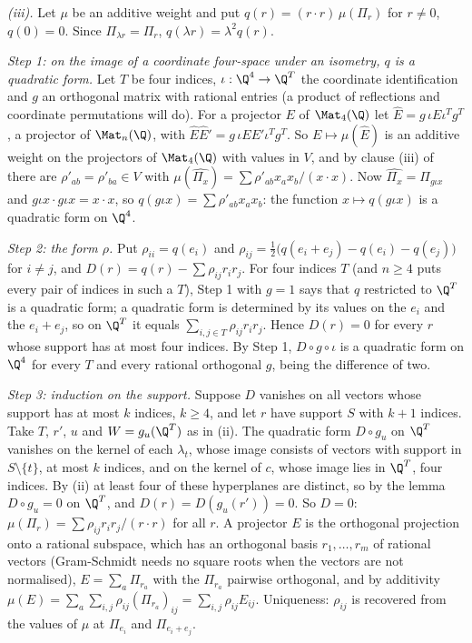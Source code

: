 \emph{(iii).} Let $\mu$ be an additive weight and put $q(r) = (r \cdot r)\,\mu(\Pi_{r})$ for $r \ne 0$, $q(0) = 0$. Since $\Pi_{\lambda r} = \Pi_{r}$, $q(\lambda r) = \lambda^{2}q(r)$.

\emph{Step 1: on the image of a coordinate four-space under an isometry, $q$ is a quadratic form.} Let $T$ be four indices, $\iota : \Q^{4} \to \Q^{T}$ the coordinate identification and $g$ an orthogonal matrix with rational entries (a product of reflections and coordinate permutations will do). For a projector $E$ of $\Mat_{4}(\Q)$ let $\hat{E} = g\,\iota E\iota^{T}g^{T}$, a projector of $\Mat_{n}(\Q)$, with $\hat{E}\hat{E}' = g\,\iota EE'\iota^{T}g^{T}$. So $E \mapsto \mu(\hat{E})$ is an additive weight on the projectors of $\Mat_{4}(\Q)$ with values in $V$, and by clause (iii) of  there are $\rho'_{ab} = \rho'_{ba} \in V$ with $\mu(\widehat{\Pi_{x}}) = \sum\rho'_{ab}x_{a}x_{b}/(x \cdot x)$. Now $\widehat{\Pi_{x}} = \Pi_{g\iota x}$ and $g\iota x \cdot g\iota x = x \cdot x$, so $q(g\iota x) = \sum\rho'_{ab}x_{a}x_{b}$: the function $x \mapsto q(g\iota x)$ is a quadratic form on $\Q^{4}$.

\emph{Step 2: the form $\rho$.} Put $\rho_{ii} = q(e_{i})$ and $\rho_{ij} = \tfrac12\bigl(q(e_{i} + e_{j}) - q(e_{i}) - q(e_{j})\bigr)$ for $i \ne j$, and $D(r) = q(r) - \sum\rho_{ij}r_{i}r_{j}$. For four indices $T$ (and $n \ge 4$ puts every pair of indices in such a $T$), Step 1 with $g = 1$ says that $q$ restricted to $\Q^{T}$ is a quadratic form; a quadratic form is determined by its values on the $e_{i}$ and the $e_{i} + e_{j}$, so on $\Q^{T}$ it equals $\sum_{i,j \in T}\rho_{ij}r_{i}r_{j}$. Hence $D(r) = 0$ for every $r$ whose support has at most four indices. By Step 1, $D \circ g \circ \iota$ is a quadratic form on $\Q^{4}$ for every $T$ and every rational orthogonal $g$, being the difference of two.

\emph{Step 3: induction on the support.} Suppose $D$ vanishes on all vectors whose support has at most $k$ indices, $k \ge 4$, and let $r$ have support $S$ with $k + 1$ indices. Take $T$, $r'$, $u$ and $W = g_{u}(\Q^{T})$ as in (ii). The quadratic form $D \circ g_{u}$ on $\Q^{T}$ vanishes on the kernel of each $\lambda_{t}$, whose image consists of vectors with support in $S \setminus \{t\}$, at most $k$ indices, and on the kernel of $c$, whose image lies in $\Q^{T}$, four indices. By (ii) at least four of these hyperplanes are distinct, so by the lemma $D \circ g_{u} = 0$ on $\Q^{T}$, and $D(r) = D(g_{u}(r')) = 0$. So $D = 0$: $\mu(\Pi_{r}) = \sum\rho_{ij}r_{i}r_{j}/(r \cdot r)$ for all $r$. A projector $E$ is the orthogonal projection onto a rational subspace, which has an orthogonal basis $r_{1}, \dots, r_{m}$ of rational vectors (Gram-Schmidt needs no square roots when the vectors are not normalised), $E = \sum_{a}\Pi_{r_{a}}$ with the $\Pi_{r_{a}}$ pairwise orthogonal, and by additivity $\mu(E) = \sum_{a}\sum_{i,j}\rho_{ij}(\Pi_{r_{a}})_{ij} = \sum_{i,j}\rho_{ij}E_{ij}$. Uniqueness: $\rho_{ij}$ is recovered from the values of $\mu$ at $\Pi_{e_{i}}$ and $\Pi_{e_{i} + e_{j}}$.

